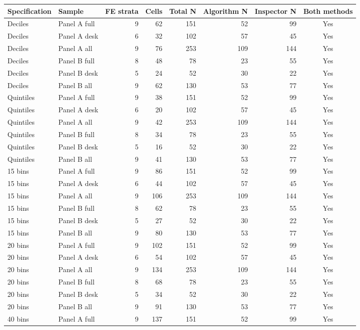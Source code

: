 \begin{tabular}{llrrrrrc}
\toprule
Specification & Sample & FE strata & Cells & Total N & Algorithm N & Inspector N & Both methods \\
\midrule
Deciles & Panel A full & 9 & 62 & 151 & 52 & 99 & Yes \\
Deciles & Panel A desk & 6 & 32 & 102 & 57 & 45 & Yes \\
Deciles & Panel A all & 9 & 76 & 253 & 109 & 144 & Yes \\
Deciles & Panel B full & 8 & 48 & 78 & 23 & 55 & Yes \\
Deciles & Panel B desk & 5 & 24 & 52 & 30 & 22 & Yes \\
Deciles & Panel B all & 9 & 62 & 130 & 53 & 77 & Yes \\
Quintiles & Panel A full & 9 & 38 & 151 & 52 & 99 & Yes \\
Quintiles & Panel A desk & 6 & 20 & 102 & 57 & 45 & Yes \\
Quintiles & Panel A all & 9 & 42 & 253 & 109 & 144 & Yes \\
Quintiles & Panel B full & 8 & 34 & 78 & 23 & 55 & Yes \\
Quintiles & Panel B desk & 5 & 16 & 52 & 30 & 22 & Yes \\
Quintiles & Panel B all & 9 & 41 & 130 & 53 & 77 & Yes \\
15 bins & Panel A full & 9 & 86 & 151 & 52 & 99 & Yes \\
15 bins & Panel A desk & 6 & 44 & 102 & 57 & 45 & Yes \\
15 bins & Panel A all & 9 & 106 & 253 & 109 & 144 & Yes \\
15 bins & Panel B full & 8 & 62 & 78 & 23 & 55 & Yes \\
15 bins & Panel B desk & 5 & 27 & 52 & 30 & 22 & Yes \\
15 bins & Panel B all & 9 & 80 & 130 & 53 & 77 & Yes \\
20 bins & Panel A full & 9 & 102 & 151 & 52 & 99 & Yes \\
20 bins & Panel A desk & 6 & 54 & 102 & 57 & 45 & Yes \\
20 bins & Panel A all & 9 & 134 & 253 & 109 & 144 & Yes \\
20 bins & Panel B full & 8 & 68 & 78 & 23 & 55 & Yes \\
20 bins & Panel B desk & 5 & 34 & 52 & 30 & 22 & Yes \\
20 bins & Panel B all & 9 & 91 & 130 & 53 & 77 & Yes \\
40 bins & Panel A full & 9 & 137 & 151 & 52 & 99 & Yes \\

\end{tabular}
